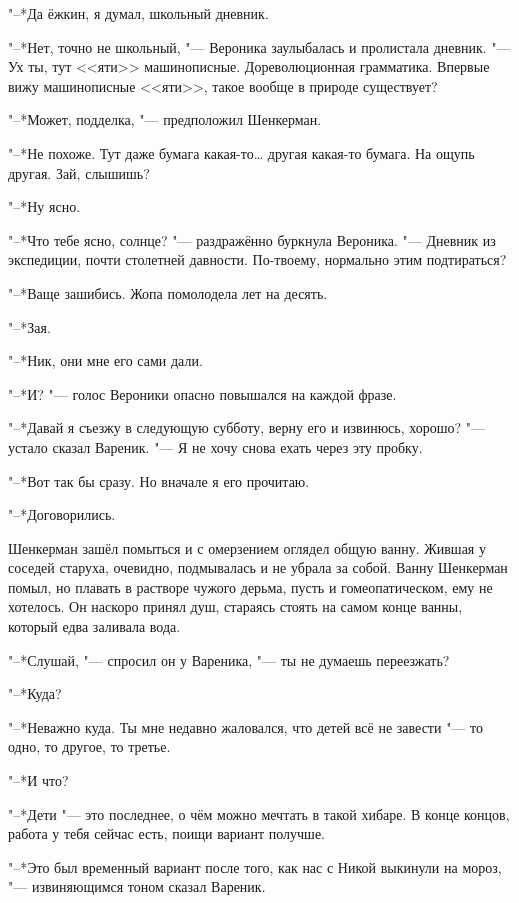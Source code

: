 "--*Да ёжкин, я думал, школьный дневник.

"--*Нет, точно не школьный, "--- Вероника заулыбалась и пролистала дневник.
"--- Ух ты, тут <<яти>> машинописные.
Дореволюционная грамматика.
Впервые вижу машинописные <<яти>>, такое вообще в природе существует?

"--*Может, подделка, "--- предположил Шенкерман.

"--*Не похоже.
Тут даже бумага какая-то\ldots{} другая какая-то бумага.
На ощупь другая.
Зай, слышишь?

"--*Ну ясно.

"--*Что тебе ясно, солнце? "--- раздражённо буркнула Вероника.
"--- Дневник из экспедиции, почти столетней давности.
По-твоему, нормально этим подтираться?

"--*Ваще зашибись.
Жопа помолодела лет на десять.

"--*Зая.

"--*Ник, они мне его сами дали.

"--*И? "--- голос Вероники опасно повышался на каждой фразе.

"--*Давай я съезжу в следующую субботу, верну его и извинюсь, хорошо? "--- устало сказал Вареник.
"--- Я не хочу снова ехать через эту пробку.

"--*Вот так бы сразу.
Но вначале я его прочитаю.

"--*Договорились.

\asterism

\textspace

Шенкерман зашёл помыться и с омерзением оглядел общую ванну.
Жившая у соседей старуха, очевидно, подмывалась и не убрала за собой.
Ванну Шенкерман помыл, но плавать в растворе чужого дерьма, пусть и гомеопатическом, ему не хотелось.
Он наскоро принял душ, стараясь стоять на самом конце ванны, который едва заливала вода.

"--*Слушай, "--- спросил он у Вареника, "--- ты не думаешь переезжать?

"--*Куда?

"--*Неважно куда.
Ты мне недавно жаловался, что детей всё не завести "--- то одно, то другое, то третье.

"--*И что?

"--*Дети "--- это последнее, о чём можно мечтать в такой хибаре.
В конце концов, работа у тебя сейчас есть, поищи вариант получше.

"--*Это был временный вариант после того, как нас с Никой выкинули на мороз, "--- извиняющимся тоном сказал Вареник.


